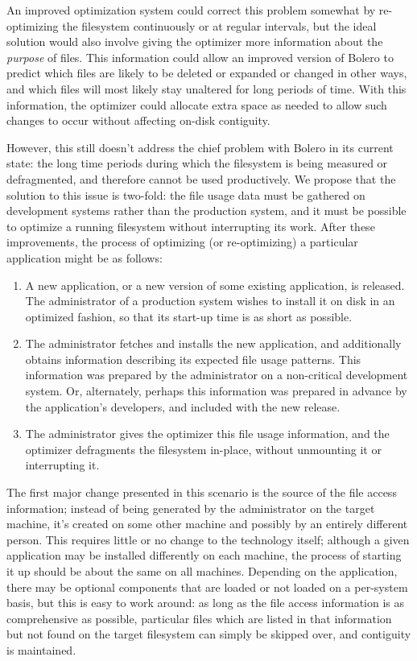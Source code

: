 \documentclass[10pt,twocolumn,letterpaper]{article}
\begin{document}
An improved optimization system could correct this problem somewhat by re-optimizing the filesystem continuously or at regular intervals, but the ideal solution would also involve giving the optimizer more information about the \emph{purpose} of files. This information could allow an improved version of Bolero to predict which files are likely to be deleted or expanded or changed in other ways, and which files will most likely stay unaltered for long periods of time. With this information, the optimizer could allocate extra space as needed to allow such changes to occur without affecting on-disk contiguity.

However, this still doesn't address the chief problem with Bolero in its current state: the long time periods during which the filesystem is being measured or defragmented, and therefore cannot be used productively. We propose that the solution to this issue is two-fold: the file usage data must be gathered on development systems rather than the production system, and it must be possible to optimize a running filesystem without interrupting its work. After these improvements, the process of optimizing (or re-optimizing) a particular application might be as follows:
\begin{enumerate}
\item A new application, or a new version of some existing application, is released. The administrator of a production system wishes to install it on disk in an optimized fashion, so that its start-up time is as short as possible.
\item The administrator fetches and installs the new application, and additionally obtains information describing its expected file usage patterns. This information was prepared by the administrator on a non-critical development system. Or, alternately, perhaps this information was prepared in advance by the application's developers, and included with the new release.
\item The administrator gives the optimizer this file usage information, and the optimizer defragments the filesystem in-place, without unmounting it or interrupting it.
\end{enumerate}

The first major change presented in this scenario is the source of the file access information; instead of being generated by the administrator on the target machine, it's created on some other machine and possibly by an entirely different person. This requires little or no change to the technology itself; although a given application may be installed differently on each machine, the process of starting it up should be about the same on all machines. Depending on the application, there may be optional components that are loaded or not loaded on a per-system basis, but this is easy to work around: as long as the file access information is as comprehensive as possible, particular files which are listed in that information but not found on the target filesystem can simply be skipped over, and contiguity is maintained.
\end{document}
